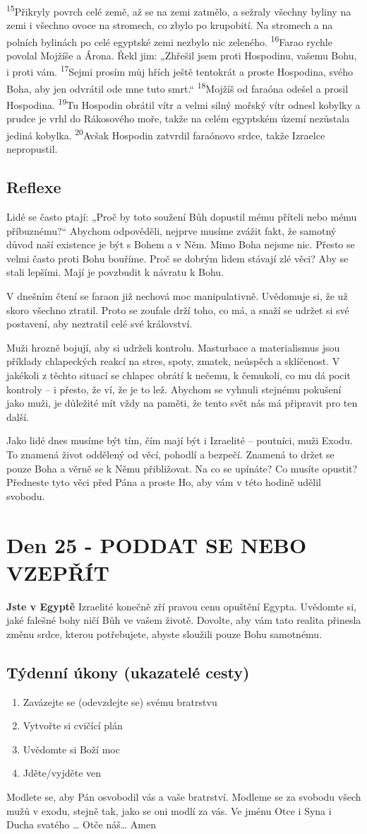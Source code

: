 \documentclass[11pt]{article}
\newcommand{\zacatekCtvrtyTyden}{
  \textbf{Jste v Egyptě} \newline
  Izraelité konečně zří pravou cenu opuštění Egypta. Uvědomte si, jaké falešné bohy ničí Bůh ve vašem životě.
Dovolte, aby vám tato realita přinesla změnu srdce, kterou potřebujete, abyste sloužili pouze Bohu samotnému.

\subsection*{Týdenní úkony (ukazatelé cesty)}
\begin{enumerate}
  \item Zavázejte se (odevzdejte se) svému bratrstvu
  \item Vytvořte si cvičící plán
  \item Uvědomte si Boží moc
  \item Jděte/vyjděte ven
\end{enumerate}
Modlete se, aby Pán osvobodil vás a vaše bratrství. \newline
Modleme se za svobodu všech mužů v exodu, stejně tak, jako se oni modlí za vás.\newline
Ve jménu Otce i Syna i Ducha svatého …  Otče náš… Amen
}
\begin{document}
{\textsuperscript{15}Přikryly povrch celé země, až se na zemi zatmělo, a sežraly všechny byliny na zemi i všechno ovoce na stromech, co zbylo po krupobití. Na stromech a na polních bylinách po celé egyptské zemi nezbylo nic zeleného.
\textsuperscript{16}Farao rychle povolal Mojžíše a Árona. Řekl jim: „Zhřešil jsem proti Hospodinu, vašemu Bohu, i proti vám.
\textsuperscript{17}Sejmi prosím můj hřích ještě tentokrát a proste Hospodina, svého Boha, aby jen odvrátil ode mne tuto smrt.“
\textsuperscript{18}Mojžíš od faraóna odešel a prosil Hospodina.
\textsuperscript{19}Tu Hospodin obrátil vítr a velmi silný mořský vítr odnesl kobylky a prudce je vrhl do Rákosového moře, takže na celém egyptském území nezůstala jediná kobylka.
\textsuperscript{20}Avšak Hospodin zatvrdil faraónovo srdce, takže Izraelce nepropustil.
}

\subsection*{Reflexe}

Lidé se často ptají: „Proč by toto soužení Bůh dopustil mému příteli nebo mému příbuznému?“ Abychom odpověděli, nejprve
musíme zvážit fakt, že samotný důvod naší existence je být s Bohem a v Něm. Mimo Boha nejsme nic. Přesto se velmi často
proti Bohu bouříme. Proč se dobrým lidem stávají zlé věci? Aby se stali lepšími. Mají je povzbudit k návratu k Bohu.

V dnešním čtení se faraon již nechová moc manipulativně. Uvědomuje si, že už skoro všechno ztratil. Proto se zoufale drží
toho, co má, a snaží se udržet si své postavení, aby neztratil celé své království.

Muži hrozně bojují, aby si udrželi kontrolu. Masturbace a materialismus jsou příklady chlapeckých reakcí na stres, spoty,
zmatek, neúspěch a sklíčenost. V jakékoli z těchto situací se chlapec obrátí k nečemu, k čemukoli, co mu dá pocit kontroly – i
přesto, že ví, že je to lež. Abychom se vyhnuli stejnému pokušení jako muži, je důležité mít vždy na paměti, že tento svět nás
má připravit pro ten další.

Jako lidé dnes musíme být tím, čím mají být i Izraelité – poutníci, muži Exodu. To znamená život oddělený od věcí, pohodlí a
bezpečí. Znamená to držet se pouze Boha a věrně se k Němu přibližovat. Na co se upínáte? Co musíte opustit? Předneste tyto
věci před Pána a proste Ho, aby vám v této hodině udělil svobodu.


\newpage
\section{Den 25 - PODDAT SE NEBO VZEPŘÍT}
\zacatekCtvrtyTyden
\end{document}
